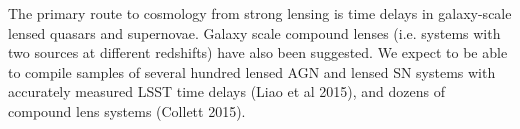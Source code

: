 %
%
%
%
%
%
%

\label{sec:sl_just}

The primary route to cosmology from strong lensing is time delays in
galaxy-scale lensed quasars and supernovae. Galaxy scale compound lenses
(i.e. systems with two sources at different redshifts) have also been
suggested. We expect to be able to compile samples of several hundred lensed AGN
and lensed SN systems with accurately measured LSST time delays (Liao et al 2015),
and dozens of compound lens systems (Collett 2015).

